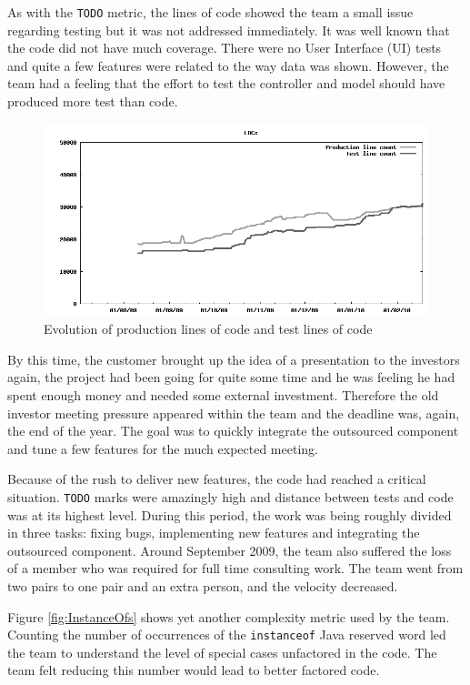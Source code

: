 \documentclass[lnbip]{svmultln}
\begin{document}
As with the \texttt{TODO} metric, the lines of code showed the team a
small issue regarding testing but it was not addressed immediately. It
was well known that the code did not have much coverage. There were no
User Interface (UI) tests and quite a few features were related to the
way data was shown. However, the team had a feeling that the effort to
test the controller and model should have produced more test than
code.

\begin{figure}[hbt]
  \centerline{
    \includegraphics[width=120mm]{LOCs}
  }
  \caption{Evolution of production lines of code and test lines of
    code}
  \label{fig:LOCs}
\end{figure}

By this time, the customer brought up the idea of a presentation to
the investors again, the project had been going for quite some time
and he was feeling he had spent enough money and needed some external
investment. Therefore the old investor meeting pressure appeared
within the team and the deadline was, again, the end of the year. The
goal was to quickly integrate the outsourced component and tune a few
features for the much expected meeting.

Because of the rush to deliver new features, the code had reached a
critical situation. \texttt{TODO} marks were amazingly high and
distance between tests and code was at its highest level.  During this
period, the work was being roughly divided in three tasks: fixing
bugs, implementing new features and integrating the outsourced
component. Around September 2009, the team also suffered the loss of a
member who was required for full time consulting work. The team went
from two pairs to one pair and an extra person, and the velocity
decreased.

Figure \ref{fig:InstanceOfs} shows yet another complexity metric used
by the team. Counting the number of occurrences of the
\texttt{instanceof} Java reserved word led the team to understand the
level of special cases unfactored in the code. The team felt reducing
this number would lead to better factored code.
\end{document}
